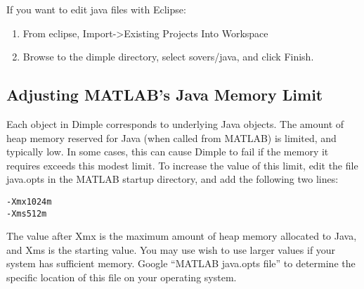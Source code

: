 If you want to edit java files with Eclipse:

\begin{enumerate}
\item From eclipse, Import-\textgreater Existing Projects Into Workspace
\item Browse to the dimple directory, select sovers/java, and click Finish.
\end{enumerate}



\ifmatlab

\subsection{Adjusting MATLAB's Java Memory Limit}

Each object in Dimple corresponds to underlying Java objects. The amount of heap memory reserved for Java (when called from MATLAB) is limited, and typically low.  In some cases, this can cause Dimple to fail if the memory it requires exceeds this modest limit.  To increase the value of this limit, edit the file java.opts in the MATLAB startup directory, and add the following two lines:

\begin{lstlisting}
-Xmx1024m
-Xms512m
\end{lstlisting}

The value after Xmx is the maximum amount of heap memory allocated to Java, and Xms is the starting value.  You may use wish to use larger values if your system has sufficient memory.  Google ``MATLAB java.opts file'' to determine the specific location of this file on your operating system.

\fi


